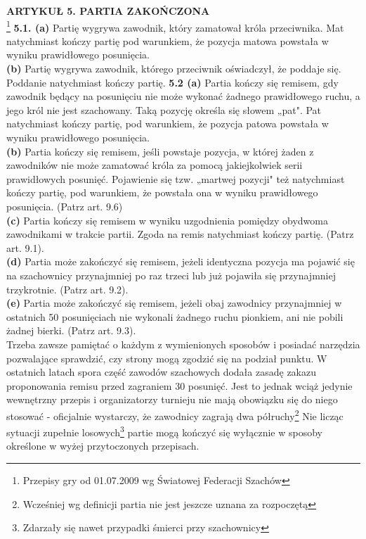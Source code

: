 \documentclass[12pt,leqno]{article}
\begin{document}
{\bf ARTYKUŁ 5. PARTIA ZAKOŃCZONA}\\ \footnote{Przepisy gry od 01.07.2009 wg Światowej Federacji Szachów}
{\bf 5.1. (a)} Partię wygrywa zawodnik, który zamatował króla
przeciwnika. Mat natychmiast kończy partię pod warunkiem,
że pozycja matowa powstała w wyniku prawidłowego
posunięcia.\\
{\bf (b)} Partię wygrywa zawodnik, którego przeciwnik oświadczył,
że poddaje się. Poddanie natychmiast kończy partię.
{\bf 5.2 (a)} Partia kończy się remisem, gdy zawodnik będący na
posunięciu nie może wykonać żadnego prawidłowego
ruchu, a jego król nie jest szachowany. Taką pozycję
określa się słowem „pat". Pat natychmiast kończy partię,
pod warunkiem, że pozycja patowa powstała w
wyniku prawidłowego posunięcia.\\
{\bf (b)} Partia kończy się remisem, jeśli powstaje pozycja, w
której żaden z zawodników nie może zamatować króla
za pomocą jakiejkolwiek serii prawidłowych posunięć.
Pojawienie się tzw. „martwej pozycji" też natychmiast
kończy partię, pod warunkiem, że powstała ona w wyniku
prawidłowego posunięcia. (Patrz art. 9.6)\\
{\bf (c)} Partia kończy się remisem w wyniku uzgodnienia pomiędzy
obydwoma zawodnikami w trakcie partii. Zgoda
na remis natychmiast kończy partię. (Patrz art. 9.1).\\
{\bf (d)} Partia może zakończyć się remisem, jeżeli identyczna
pozycja ma pojawić się na szachownicy przynajmniej
po raz trzeci lub już pojawiła się przynajmniej trzykrotnie.
(Patrz art. 9.2).\\
{\bf (e)} Partia może zakończyć się remisem, jeżeli obaj zawodnicy
przynajmniej w ostatnich 50 posunięciach nie
wykonali żadnego ruchu pionkiem, ani nie pobili żadnej
bierki. (Patrz art. 9.3).\\


Trzeba zawsze pamiętać o każdym z wymienionych sposobów i posiadać narzędzia pozwalające sprawdzić, czy strony mogą zgodzić się na podział punktu. W ostatnich latach spora część zawodów szachowych dodała zasadę zakazu proponowania remisu przed zagraniem 30 posunięć. Jest to jednak wciąż jedynie wewnętrzny przepis i organizatorzy turnieju nie mają obowiązku się do niego stosować - oficjalnie wystarczy, że zawodnicy zagrają dwa półruchy\footnote{Wcześniej wg definicji partia nie jest jeszcze uznana za rozpoczętą}
Nie licząc sytuacji zupełnie losowych\footnote{Zdarzały się nawet przypadki śmierci przy szachownicy} partie mogą kończyć się wyłącznie w sposoby określone w wyżej przytoczonych przepisach. 
\end{document}
